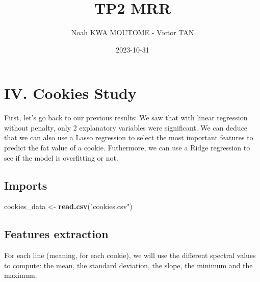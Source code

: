 \documentclass[
]{article}
\title{TP2 MRR}
\author{Noah KWA MOUTOME - Victor TAN}
\date{2023-10-31}
\newenvironment{Shaded}{\begin{snugshade}}{\end{snugshade}}
\newcommand{\FunctionTok}[1]{\textcolor[rgb]{0.13,0.29,0.53}{\textbf{#1}}}
\newcommand{\NormalTok}[1]{#1}
\newcommand{\OtherTok}[1]{\textcolor[rgb]{0.56,0.35,0.01}{#1}}
\newcommand{\StringTok}[1]{\textcolor[rgb]{0.31,0.60,0.02}{#1}}
\begin{document}
\maketitle

\section{IV. Cookies Study}\label{iv.-cookies-study}

First, let's go back to our previous results: We saw that with linear
regression without penalty, only 2 explanatory variables were
significant. We can deduce that we can also use a Lasso regression to
select the most important features to predict the fat value of a cookie.
Futhermore, we can use a Ridge regression to see if the model is
overfitting or not.

\subsection{Imports}\label{imports}

\begin{Shaded}
\begin{Highlighting}[]
\NormalTok{cookies\_data }\OtherTok{\textless{}{-}} \FunctionTok{read.csv}\NormalTok{(}\StringTok{"cookies.csv"}\NormalTok{)}
\end{Highlighting}
\end{Shaded}

\subsection{Features extraction}\label{features-extraction}

For each line (meaning, for each cookie), we will use the different
spectral values to compute: the mean, the standard deviation, the slope,
the minimum and the maximum.
\end{document}

